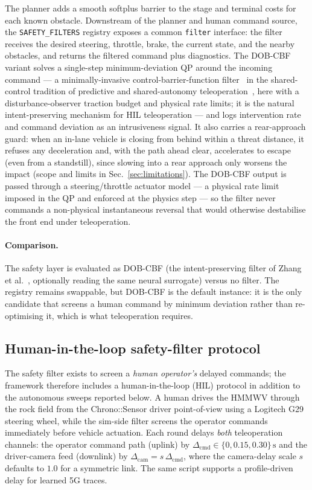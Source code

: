 \documentclass[conference,letterpaper,10pt]{IEEEtran}
\begin{document}
The planner adds a smooth softplus barrier to the stage and terminal
costs for each known obstacle. Downstream of the planner and human
command source, the \texttt{SAFETY\_FILTERS} registry exposes a
common \texttt{filter} interface: the filter receives the desired
steering, throttle, brake, the current state, and the nearby
obstacles, and returns the filtered command plus diagnostics. The
DOB-CBF variant solves a single-step minimum-deviation QP around the
incoming command --- a minimally-invasive control-barrier-function
filter~\cite{Ames19} in the shared-control tradition of predictive and
shared-autonomy teleoperation~\cite{Hirche12,Dragan13}, here with a
disturbance-observer traction budget and physical rate limits; it is the
natural intent-preserving mechanism for HIL teleoperation --- and logs
intervention rate and command deviation as an intrusiveness signal. It also carries a rear-approach guard: when an
in-lane vehicle is closing from behind within a threat distance, it refuses
any deceleration and, with the path ahead clear, accelerates to escape (even
from a standstill), since slowing into a rear approach only worsens the impact
(scope and limits in Sec.~\ref{sec:limitations}). The DOB-CBF output
is passed through a steering/throttle actuator model --- a physical
rate limit imposed in the QP and enforced at the physics step --- so
the filter never commands a non-physical instantaneous reversal that
would otherwise destabilise the front end under teleoperation.

\paragraph{Comparison.}
The safety layer is evaluated as DOB-CBF (the intent-preserving filter
of Zhang et al.~\cite{Zhang25}, optionally reading the same neural
surrogate) versus no filter. The registry remains swappable, but
DOB-CBF is the default instance: it is the only candidate that screens
a human command by minimum deviation rather than re-optimising it, which
is what teleoperation requires.

\subsection{Human-in-the-loop safety-filter protocol}
\label{sec:safety_hil}

The safety filter exists to screen a \emph{human operator's}
delayed commands; the framework therefore includes a human-in-the-loop
(HIL) protocol in addition to the autonomous sweeps reported below. A
human drives the HMMWV through the rock field from the Chrono::Sensor
driver point-of-view using a Logitech G29 steering wheel, while the
sim-side filter screens the operator commands immediately before
vehicle actuation. Each round delays \emph{both} teleoperation
channels: the operator command path (uplink) by
$\Delta_\mathrm{cmd} \in \{0, 0.15, 0.30\}\,\mathrm{s}$ and the
driver-camera feed (downlink) by
$\Delta_\mathrm{cam} = s\,\Delta_\mathrm{cmd}$, where the camera-delay
scale $s$ defaults to $1.0$ for a symmetric link. The same script
supports a profile-driven delay for learned 5G traces.
\end{document}
